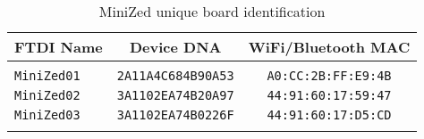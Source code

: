 %
\begin{table}[b]
\caption{MiniZed unique board identification}
\label{tab:minized_unique_id}
\begin{center}
\begin{tabular}{|l|c|c|}
\hline
FTDI Name & Device DNA & WiFi/Bluetooth MAC\\
\hline\hline
&&\\
\texttt{MiniZed01} & \texttt{2A11A4C684B90A53} & \texttt{A0:CC:2B:FF:E9:4B}\\
\texttt{MiniZed02} & \texttt{3A1102EA74B20A97} & \texttt{44:91:60:17:59:47}\\
\texttt{MiniZed03} & \texttt{3A1102EA74B0226F} & \texttt{44:91:60:17:D5:CD}\\
&&\\
\hline
\end{tabular}
\end{center}
\end{table}



